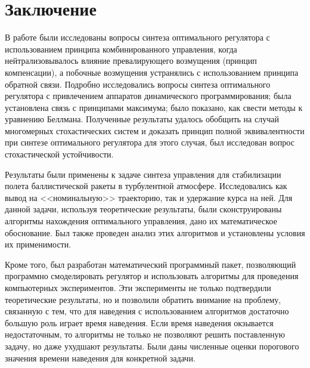 


\chapter*{Заключение}



В работе были исследованы вопросы синтеза оптимального регулятора с использованием принципа комбинированного управления, когда нейтрализовывалось влияние превалирующего возмущения (принцип компенсации), а побочные возмущения устранялись с использованием принципа обратной связи. Подробно исследовались вопросы синтеза оптимального регулятора с привлечением аппаратов динамического программирования; была установлена связь с принципами максимума; было показано, как свести методы к уравнению Беллмана. Полученные результаты удалось обобщить на случай многомерных стохастических систем и доказать принцип полной эквивалентности при синтезе оптимального регулятора для этого случая, был исследован вопрос стохастической устойчивости.

Результаты были применены к задаче синтеза управления для стабилизации полета баллистической ракеты в турбулентной атмосфере. Исследовались как вывод на <<номинальную>> траекторию, так и удержание курса на ней. Для данной задачи, используя теоретические результаты, были сконструированы алгоритмы нахождения оптимального управления, дано их математическое обоснование. Был также проведен анализ этих алгоритмов и установлены условия их применимости.

Кроме того, был разработан математический программный пакет, позволяющий программно смоделировать регулятор и использовать алгоритмы для проведения компьютерных экспериментов. Эти эксперименты не только подтвердили теоретические результаты, но и позволили обратить внимание на проблему, связанную с тем, что для наведения с использованием алгоритмов достаточно большую роль играет время наведения. Если время наведения окзывается недостаточным, то алгоритмы не только не позволяют решить поставленную задачу, но даже ухудшают результаты. Были даны численные оценки порогового значения времени наведения для конкретной задачи.
